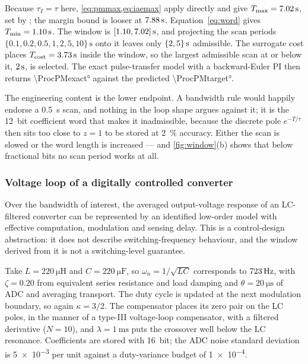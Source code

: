 \documentclass[a4paper,fleqn]{cas-sc}
\theoremstyle{remark}
\newcommand{\Tmin}{T_{\min}}
\newcommand{\Tmax}{T_{\max}}
\newcommand{\wn}{\omega_n}
\newcommand{\Tcost}{T_{\mathrm{cost}}}
\begin{document}
Because $\tau_I=\tau$ here, \cref{eq:pmmax,eq:iaemax} apply directly and give
$\Tmax=\ProcTmax\,\mathrm{s}$, set by \ProcActiveUpper; the margin bound is
looser at $7.88\,\mathrm{s}$. Equation~\eqref{eq:word} gives
$\Tmin=\ProcTmin\,\mathrm{s}$. The window is
$[1.10,7.02]\,\mathrm{s}$, and projecting the scan periods
$\{0.1,0.2,0.5,1,2,5,10\}\,\mathrm{s}$ onto it leaves only
$\{2, 5\}\,\mathrm{s}$ admissible. The surrogate cost places
$\Tcost=\ProcTcost\,\mathrm{s}$ inside the window, so the largest admissible
scan at or below it, $2\,\mathrm{s}$, is selected. The exact
pulse-transfer model with a backward-Euler PI then returns
\ang{\ProcPMexact} against the predicted \ang{\ProcPMtarget}.

The engineering content is the lower endpoint. A bandwidth rule would happily
endorse a \SI{0.5}{\second} scan, and nothing in the loop shape argues
against it; it is the \SI{12}{bit} coefficient word that makes it
inadmissible, because the discrete pole $e^{-T/\tau}$ then sits too close to
$z=1$ to be stored at \SI{2}{\percent} accuracy. Either the scan is slowed or
the word length is increased --- and \cref{fig:window}(b) shows that below
\WindowOpensBits{} fractional bits no scan period works at all.

\subsubsection{Voltage loop of a digitally controlled converter}
Over the bandwidth of interest, the averaged output-voltage response of an
LC-filtered converter can be represented by an identified low-order model
with effective computation, modulation and sensing delay. This is a
control-design abstraction: it does not describe switching-frequency
behaviour, and the window derived from it is not a switching-level
guarantee.

Take $L=\SI{220}{\micro\henry}$ and $C=\SI{220}{\micro\farad}$, so
$\wn=1/\sqrt{LC}$ corresponds to $723\,\mathrm{Hz}$, with $\zeta=0.20$
from equivalent series resistance and load damping and
$\theta=\SI{20}{\micro\second}$ of ADC and averaging transport. The duty
cycle is updated at the next modulation boundary, so again $\kappa=3/2$. The
compensator places its zero pair on the LC poles, in the manner of a
type-III voltage-loop compensator, with a filtered derivative ($N=10$), and
$\lambda=\SI{1}{\milli\second}$ puts the crossover well below the LC
resonance. Coefficients are stored with \SI{16}{bit}; the ADC noise standard
deviation is \num{5e-3} per unit against a duty-variance budget of
\num{1e-4}.
\end{document}
